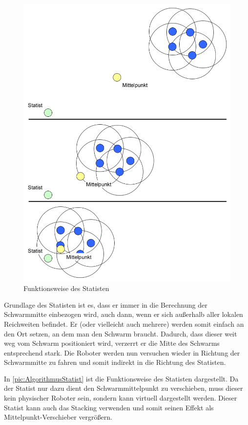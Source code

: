\begin{figure}
	\includegraphics[width=\pictureWidthBig,keepaspectratio]{graphics/AlgorithmusStatist.png}
	\caption{Funktionsweise des Statisten}
	\label{pic:AlgorithmusStatist}
\end{figure}

Grundlage des Statisten ist es, dass er immer in die Berechnung der Schwarmmitte einbezogen wird, auch dann, wenn er sich außerhalb aller lokalen Reichweiten befindet. Er (oder vielleicht auch mehrere) werden somit einfach an den Ort setzen, an dem man den Schwarm braucht. Dadurch, dass dieser weit weg vom Schwarm positioniert wird, verzerrt er die Mitte des Schwarms entsprechend stark. Die Roboter werden nun versuchen wieder in Richtung der Schwarmmitte zu fahren und somit indirekt in die Richtung des Statisten.

In \autoref{pic:AlgorithmusStatist} ist die Funktionsweise des Statisten dargestellt. Da der Statist nur dazu dient den Schwarmmittelpunkt zu verschieben, muss dieser kein physischer Roboter sein, sondern kann virtuell dargestellt werden. Dieser Statist kann auch das Stacking verwenden und somit seinen Effekt als Mittelpunkt-Verschieber vergrößern.

